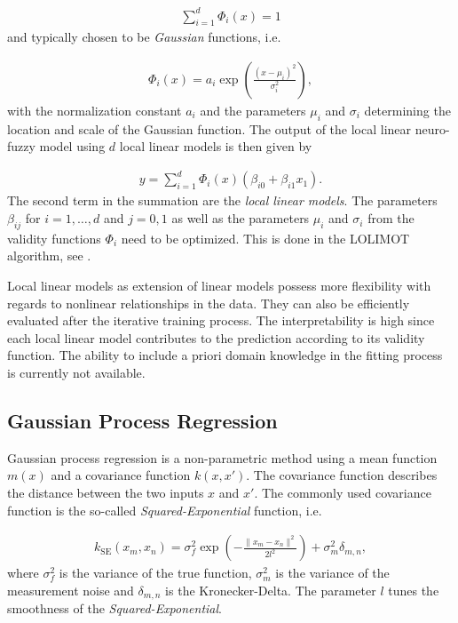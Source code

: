 \begin{align} \label{eq:LILOMOT-normalized-basis-fucntions}
	\sum_{i=1}^d \Phi_i(x) = 1
\end{align}
%
and typically chosen to be \emph{Gaussian} functions, i.e. 

\begin{align} \label{eq:validity-function}
	\Phi_i(x) = a_i \exp \left(\frac{(x - \mu_i)^2}{\sigma_i^2} \right),	
\end{align}
%
with the normalization constant $a_i$ and the parameters $\mu_i$ and $\sigma_i$ determining the location and scale of the Gaussian function. The output of the local linear neuro-fuzzy model using $d$ local linear models is then given by

\begin{align} \label{eq:LOLIMOT}
	y = \sum_{i=1}^d  \Phi_i(x) \left(\beta_{i0} + \beta_{i1} x_1\right).
\end{align}
%
The second term in the summation are the \emph{local linear models}. The parameters $\beta_{ij}$ for $i=1, \dots, d$ and $j=0, 1$ as well as the parameters $\mu_i$ and $\sigma_i$ from the validity functions $\Phi_i$ need to be optimized. This is done in the LOLIMOT algorithm, see \cite{nelles2013nonlinear}. 

Local linear models as extension of linear models possess more flexibility with regards to nonlinear relationships in the data. They can also be efficiently evaluated after the iterative training process. The interpretability is high since each local linear model contributes to the prediction according to its validity function. The ability to include a priori domain knowledge in the fitting process is currently not available.   

\subsection{Gaussian Process Regression}
Gaussian process regression is a non-parametric method using a mean function $m(x)$ and a covariance function $k(x, x')$. The covariance function describes the distance between the two inputs $x$ and $x'$. The commonly used covariance function is the so-called \emph{Squared-Exponential} function, i.e.
 
\begin{align}
 	k_{\mathrm{SE}}(x_m, x_n) = \sigma_f^2 \exp \left(-\frac{\lVert x_m - x_n \rVert^2 }{2l^2}\right) + \sigma_m^2 \delta_{m,n},
\end{align}
%
where $\sigma_f^2$ is the variance of the true function, $\sigma_m^2$ is the variance of the measurement noise and $\delta_{m,n}$ is the Kronecker-Delta. The parameter $l$ tunes the smoothness of the \emph{Squared-Exponential}. 

